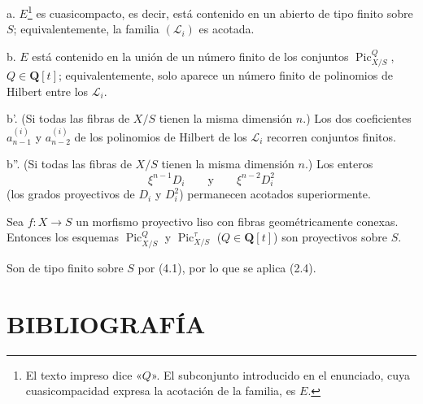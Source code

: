 \noindent a. $E$\footnote{El texto impreso dice «$Q$». El subconjunto
introducido en el enunciado, cuya cuasicompacidad expresa la acotación de la
familia, es $E$.} es cuasicompacto, es decir, está contenido en un abierto de
tipo finito sobre $S$; equivalentemente, la familia $(\mathcal L_i)$ es
acotada.

\noindent b. $E$ está contenido en la unión de un número finito de los
conjuntos $\operatorname{Pic}_{X/S}^Q$, $Q\in\mathbf Q[t]$; equivalentemente,
solo aparece un número finito de polinomios de Hilbert entre los
$\mathcal L_i$.

\noindent b'. (Si todas las fibras de $X/S$ tienen la misma dimensión $n$.)
Los dos coeficientes $a_{n-1}^{(i)}$ y $a_{n-2}^{(i)}$ de los polinomios de
Hilbert de los $\mathcal L_i$ recorren conjuntos finitos.

\noindent b''. (Si todas las fibras de $X/S$ tienen la misma dimensión $n$.)
Los enteros
\[
\xi^{n-1}D_i\qquad\text{y}\qquad\xi^{n-2}D_i^2
\]
(los grados proyectivos de $D_i$ y $D_i^2$) permanecen acotados superiormente.

 Sea $f:X\longrightarrow S$ un morfismo proyectivo liso
con fibras geométricamente conexas. Entonces los esquemas
$\operatorname{Pic}_{X/S}^Q$ y $\operatorname{Pic}_{X/S}^\tau$
($Q\in\mathbf Q[t]$) son proyectivos sobre $S$.

Son de tipo finito sobre $S$ por (4.1), por lo que se aplica (2.4).

\section*{BIBLIOGRAFÍA}

